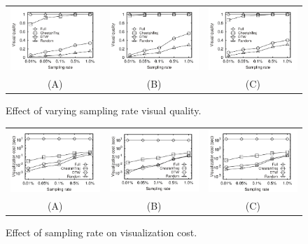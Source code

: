\begin{figure}
	\centering
	\small
	\begin{tabular}{ccc}
		\includegraphics[width=0.3\linewidth]{pictures/quantitative_study/rate_porto_q}
		&
		\includegraphics[width=0.3\linewidth]{pictures/quantitative_study/rate_sz_q}
        &
		\includegraphics[width=0.3\linewidth]{pictures/quantitative_study/rate_cd_q}
		\\
		(A) \pt{}
		&
		(B) \sz{}
		&
		(C) \cd{}
	\end{tabular}
    \trim
	\caption{Effect of varying sampling rate visual quality.}
	\label{fig:rate_quality}
	\trim \trim
\end{figure}

\begin{figure}
	\centering
	\small
	\begin{tabular}{ccc}
		\includegraphics[width=0.3\linewidth]{pictures/quantitative_study/rate_porto_t}
		&
		\includegraphics[width=0.3\linewidth]{pictures/quantitative_study/rate_sz_t}
        &
		\includegraphics[width=0.3\linewidth]{pictures/quantitative_study/rate_cd_t}
		\\
		(A) \pt{}
		&
		(B) \sz{}
		&
		(C) \cd{}
	\end{tabular}
    \trim
	\caption{Effect of  sampling rate on visualization cost.}
	\label{fig:rate_vistime}
	\trim \trim
\end{figure}

